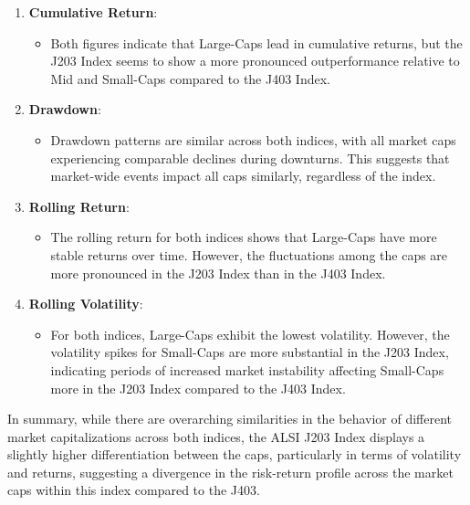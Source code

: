 \documentclass[11pt,preprint, authoryear]{elsarticle}
\numberwithin{equation}{section}
\numberwithin{figure}{section}
\numberwithin{table}{section}
\def\tightlist{} %
\begin{document}
\begin{enumerate}
\def\labelenumi{\arabic{enumi}.}
\tightlist
\item
  \textbf{Cumulative Return}:

  \begin{itemize}
  \tightlist
  \item
    Both figures indicate that Large-Caps lead in cumulative returns,
    but the J203 Index seems to show a more pronounced outperformance
    relative to Mid and Small-Caps compared to the J403 Index.
  \end{itemize}
\item
  \textbf{Drawdown}:

  \begin{itemize}
  \tightlist
  \item
    Drawdown patterns are similar across both indices, with all market
    caps experiencing comparable declines during downturns. This
    suggests that market-wide events impact all caps similarly,
    regardless of the index.
  \end{itemize}
\item
  \textbf{Rolling Return}:

  \begin{itemize}
  \tightlist
  \item
    The rolling return for both indices shows that Large-Caps have more
    stable returns over time. However, the fluctuations among the caps
    are more pronounced in the J203 Index than in the J403 Index.
  \end{itemize}
\item
  \textbf{Rolling Volatility}:

  \begin{itemize}
  \tightlist
  \item
    For both indices, Large-Caps exhibit the lowest volatility. However,
    the volatility spikes for Small-Caps are more substantial in the
    J203 Index, indicating periods of increased market instability
    affecting Small-Caps more in the J203 Index compared to the J403
    Index.
  \end{itemize}
\end{enumerate}

In summary, while there are overarching similarities in the behavior of
different market capitalizations across both indices, the ALSI J203
Index displays a slightly higher differentiation between the caps,
particularly in terms of volatility and returns, suggesting a divergence
in the risk-return profile across the market caps within this index
compared to the J403.
\end{document}
